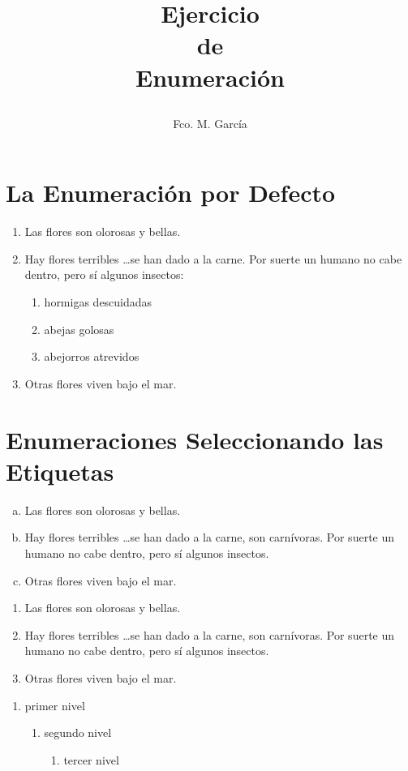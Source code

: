 \documentclass[spanish,12pt]{article}
\title
{
\HRule
\begin{flushright}
\Huge
\textbf{Ejercicio}\\[3mm]
\Large
\textbf{de}\\
\Huge
\textbf{Enumeración}
\end{flushright}
\HRule 
}
\author{\large Fco. M. García}
\begin{document}
\maketitle
\tableofcontents 

\section{La Enumeración por Defecto }
\label{lo_que_me_sugiere_paris}

\begin{enumerate}
\item Las flores son olorosas y bellas.
\item Hay flores terribles \dots se han dado a la carne. Por suerte un
  humano no cabe dentro, pero sí algunos insectos:
  \begin{enumerate}
  \item hormigas descuidadas
  \item abejas golosas
  \item abejorros atrevidos
  \end{enumerate}
\item Otras flores viven bajo el mar.
\end{enumerate}

\section{Enumeraciones Seleccionando las Etiquetas}
\label{enumeracion}

\begin{enumerate}[a.)]
\item Las flores son olorosas y bellas.
\item Hay flores terribles \dots se han dado a la carne, son
  carnívoras. Por suerte un humano no cabe dentro, pero sí algunos
  insectos.
\item Otras flores viven bajo el mar.
\end{enumerate}

\begin{enumerate}
\item Las flores son olorosas y bellas.
\item Hay flores terribles \dots se han dado a la carne, son
  carnívoras. Por suerte un humano no cabe dentro, pero sí algunos
  insectos.
\item Otras flores viven bajo el mar.
\end{enumerate}

\begin{enumerate}
\item primer nivel
  \begin{enumerate}
  \item segundo nivel
    \begin{enumerate}
    \item tercer nivel
    \end{enumerate}
  \end{enumerate}
\end{enumerate}
\end{document}
